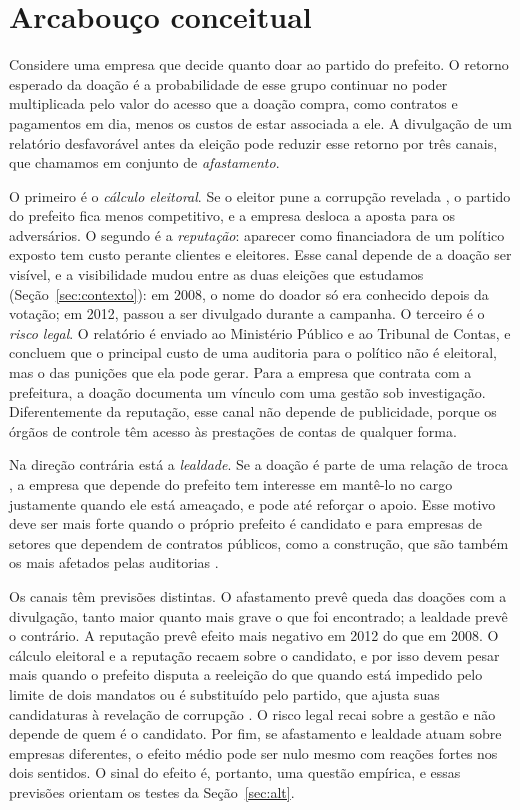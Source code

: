 \section{Arcabouço conceitual}\label{sec:teoria}

Considere uma empresa que decide quanto doar ao partido do prefeito. O retorno esperado da doação é a
probabilidade de esse grupo continuar no poder multiplicada pelo valor do acesso que a doação compra, como
contratos e pagamentos em dia, menos os custos de estar associada a ele. A divulgação de um relatório
desfavorável antes da eleição pode reduzir esse retorno por três canais, que chamamos em conjunto de
\textit{afastamento}.

O primeiro é o \textit{cálculo eleitoral}. Se o eleitor pune a corrupção revelada
\cite{ferrazfinan2008}, o partido do prefeito fica menos competitivo, e a empresa desloca a aposta para os
adversários. O segundo é a \textit{reputação}: aparecer como financiadora de um político exposto tem custo
perante clientes e eleitores. Esse canal depende de a doação ser visível, e a visibilidade mudou entre as
duas eleições que estudamos (Seção~\ref{sec:contexto}): em 2008, o nome do doador só era conhecido depois
da votação; em 2012, passou a ser divulgado durante a campanha. O terceiro é o \textit{risco legal}. O
relatório é enviado ao Ministério Público e ao Tribunal de Contas, e  concluem que o
principal custo de uma auditoria para o político não é eleitoral, mas o das punições que ela pode gerar.
Para a empresa que contrata com a prefeitura, a doação documenta um vínculo com uma gestão sob
investigação. Diferentemente da reputação, esse canal não depende de publicidade, porque os órgãos de
controle têm acesso às prestações de contas de qualquer forma.

Na direção contrária está a \textit{lealdade}. Se a doação é parte de uma relação de troca
\cite{boas2014}, a empresa que depende do prefeito tem interesse em mantê-lo no cargo justamente quando
ele está ameaçado, e pode até reforçar o apoio. Esse motivo deve ser mais forte quando o próprio prefeito
é candidato e para empresas de setores que dependem de contratos públicos, como a construção, que são
também os mais afetados pelas auditorias \cite{colonnelliprem2022}.

Os canais têm previsões distintas. O afastamento prevê queda das doações com a divulgação, tanto maior
quanto mais grave o que foi encontrado; a lealdade prevê o contrário. A reputação prevê efeito mais
negativo em 2012 do que em 2008. O cálculo eleitoral e a reputação recaem sobre o candidato, e por isso
devem pesar mais quando o prefeito disputa a reeleição do que quando está impedido pelo limite de dois
mandatos \cite{ferrazfinan2011} ou é substituído pelo partido, que ajusta suas candidaturas à revelação de
corrupção \cite{cavalcanti2018}. O risco legal recai sobre a gestão e não depende de quem é o candidato. Por fim, se
afastamento e lealdade atuam sobre empresas diferentes, o efeito médio pode ser nulo mesmo com reações
fortes nos dois sentidos. O sinal do efeito é, portanto, uma questão empírica, e essas previsões orientam
os testes da Seção~\ref{sec:alt}.


